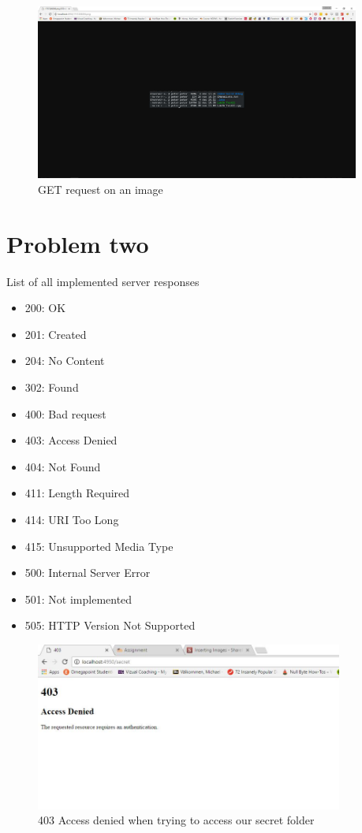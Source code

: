 \documentclass[a4paper,12pt]{article}
\numberwithin{figure}{section}
\begin{document}
\begin{figure}[hp!]
	\centering
	\label{PNG}
	\includegraphics[width=0.95\textwidth,keepaspectratio]{img/PNGFile.jpg} 
	\caption{GET request on an image}
\end{figure}

\newpage
\section{Problem two}

List of all implemented server responses
\begin{itemize}
	\item 200: OK
	\item 201: Created
	\item 204: No Content
	\item 302: Found
	\item 400: Bad request
	\item 403: Access Denied
	\item 404: Not Found
	\item 411: Length Required
	\item 414: URI Too Long
	\item 415: Unsupported Media Type
	\item 500: Internal Server Error
	\item 501: Not implemented
	\item 505: HTTP Version Not Supported
\end{itemize}

\begin{figure}[h!]
	\centering
	\label{Access denied}
	\includegraphics[width=0.90\textwidth,keepaspectratio]{img/403.jpg} 
	\caption{403 Access denied when trying to access our secret folder}
\end{figure}
\end{document}
